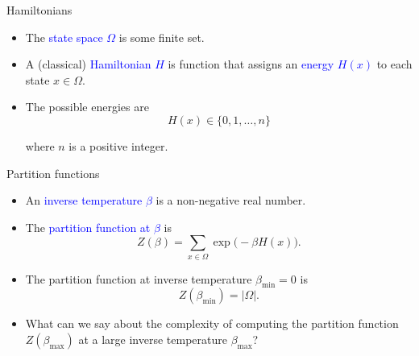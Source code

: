 \documentclass{beamer}
\renewcommand{\>}{\rangle}
\newcommand{\<}{\langle}
\begin{document}
\begin{frame}{Hamiltonians}
    \begin{itemize}
        \item The \textcolor{blue}{state space $\Omega$} is some finite set.
        
        \medskip
        \item A (classical) \textcolor{blue}{Hamiltonian $H$} is function that assigns an \textcolor{blue}{energy $H(x)$} to each state $x\in\Omega$.
        
        \medskip
        \item The possible energies are
        \begin{equation*}
            H(x)\in\{0,1,\ldots,n\}
        \end{equation*}
        
        where $n$ is a positive integer.
    \end{itemize}
\end{frame}

%

\begin{frame}{Partition functions}

\begin{itemize}
    \item An \textcolor{blue}{inverse temperature $\beta$} is a non-negative real number.
    
    \medskip
    \item The \textcolor{blue}{partition function at $\beta$} is
    \begin{equation*}
        Z(\beta) = \sum_{x\in\Omega} \exp\big(-\beta H(x)\big).
    \end{equation*}
    
    \item The partition function at inverse temperature $\beta_{\min}=0$ is
    \begin{equation*}
        Z(\beta_{\min}) = |\Omega|.        
    \end{equation*}
    
    \item What can we say about the complexity of computing the partition function $Z(\beta_{\max})$ at a large inverse temperature $\beta_{\max}$?
\end{itemize}

\end{frame}

%
\end{document}

